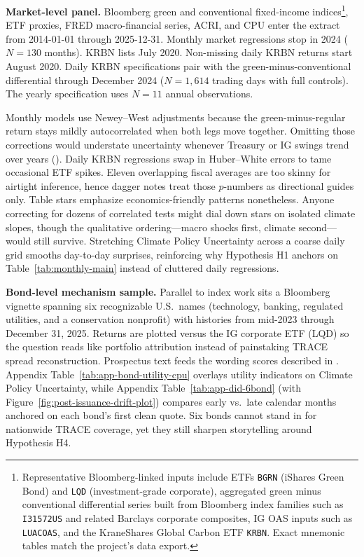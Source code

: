 \documentclass[
  11pt,
]{article}
\makeatletter
\renewcommand{\subsection}{\@startsection{subsection}{2}{\z@}{-1.6ex\@plus -0.5ex \@minus -.2ex}{0.6ex \@plus.2ex}{\normalfont\large\bfseries\color{TitleBlue}}}
\makeatother
\begin{document}
\textbf{Market-level panel.} Bloomberg green and conventional
fixed-income indices\footnote{Representative Bloomberg-linked inputs include ETFs \texttt{BGRN} (iShares Green Bond) and \texttt{LQD} (investment-grade corporate), aggregated green minus conventional differential series built from Bloomberg index families such as \texttt{I31572US} and related Barclays corporate composites, IG OAS inputs such as \texttt{LUACOAS}, and the KraneShares Global Carbon ETF \texttt{KRBN}. Exact mnemonic tables match the project's data export.},
ETF proxies, FRED macro-financial series, ACRI,
and CPU enter the extract from 2014-01-01 through 2025-12-31. Monthly market regressions stop in 2024 ($N = 130$ months). KRBN lists July 2020. Non-missing daily KRBN returns start August 2020. Daily KRBN specifications pair with the green-minus-conventional differential through December 2024 ($N = 1{,}614$ trading days with full controls). The yearly specification uses $N = 11$ annual observations.

\subsection{Standard errors and inference notes}

Monthly models use Newey--West adjustments because the green-minus-regular return stays mildly autocorrelated when both legs move together. Omitting those corrections would understate uncertainty whenever Treasury or IG swings trend over years (). Daily KRBN regressions swap in Huber--White errors to tame occasional ETF spikes. Eleven overlapping fiscal averages are too skinny for airtight inference, hence dagger notes treat those \(p\)-numbers as directional guides only. Table stars emphasize economics-friendly patterns nonetheless. Anyone correcting for dozens of correlated tests might dial down stars on isolated climate slopes, though the qualitative ordering---macro shocks first, climate second---would still survive. Stretching Climate Policy Uncertainty across a coarse daily grid smooths day-to-day surprises, reinforcing why Hypothesis H1 anchors on Table~\ref{tab:monthly-main} instead of cluttered daily regressions.

\textbf{Bond-level mechanism sample.} Parallel to index work sits a Bloomberg vignette spanning six recognizable U.S.\ names (technology, banking, regulated utilities, and a conservation nonprofit) with histories from mid-2023 through December 31, 2025. Returns are plotted versus the IG corporate ETF (LQD) so the question reads like portfolio attribution instead of painstaking TRACE spread reconstruction. Prospectus text feeds the wording scores described in . Appendix Table~\ref{tab:app-bond-utility-cpu} overlays utility indicators on Climate Policy Uncertainty, while Appendix Table~\ref{tab:app-did-6bond} (with Figure~\ref{fig:post-issuance-drift-plot}) compares early vs.\ late calendar months anchored on each bond's first clean quote. Six bonds cannot stand in for nationwide TRACE coverage, yet they still sharpen storytelling around Hypothesis H4.
\end{document}
